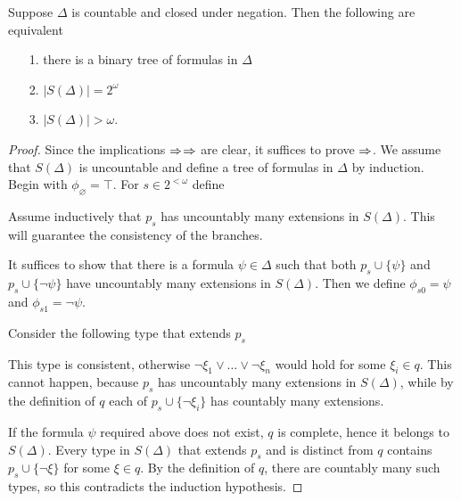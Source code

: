 \begin{lemma}\label{lem_bin_tree}
Suppose $\Delta$ is countable and closed under negation.
Then the following are equivalent\nobreak
\begin{itemize}   
\item[1.] there is a binary tree of formulas in $\Delta$
\item[2.] $\big|S(\Delta)\big|=2^\omega$
\item[3.] $\big|S(\Delta)\big|>\omega$.
\end{itemize}
\end{lemma}
\begin{proof}
Since the implications $\Rightarrow$$\Rightarrow$ are clear, it
suffices to prove $\Rightarrow$.
We assume that $S(\Delta)$ is uncountable and define a tree of
formulas in $\Delta$ by induction.
Begin with $\phi_\varnothing=\top$.
For $s\in 2^{<\omega}$ define


Assume inductively that $p_s$ has uncountably many extensions in $S(\Delta)$.
This will guarantee the consistency of the branches.

It suffices to show that there is a formula $\psi\in\Delta$ such that
both $p_s\cup\{\psi\}$ and $p_s\cup\{\neg\psi\}$ have uncountably many
extensions in $S(\Delta)$.
Then we define $\phi_{s0}=\psi$ and $\phi_{s1}=\neg\psi$.

Consider the following type that extends $p_s$


This type is consistent, otherwise $\neg\xi_1\vee\dots\vee\neg\xi_n$
would hold for some $\xi_i \in q$.
This cannot happen, because $p_s$ has uncountably many extensions in
$S(\Delta)$, while by the definition of $q$ each of
$p_s\cup\{\neg\xi_i\}$ has countably many extensions.

If the formula $\psi$ required above does not exist, $q$ is complete,
hence it belongs to $S(\Delta)$.
Every type in $S(\Delta)$ that extends $p_s$ and is distinct from $q$
contains $p_s\cup\{\neg\xi\}$ for some $\xi\in q$.
By the definition of $q$, there are countably many such types,
so this contradicts the induction hypothesis.
\end{proof}


